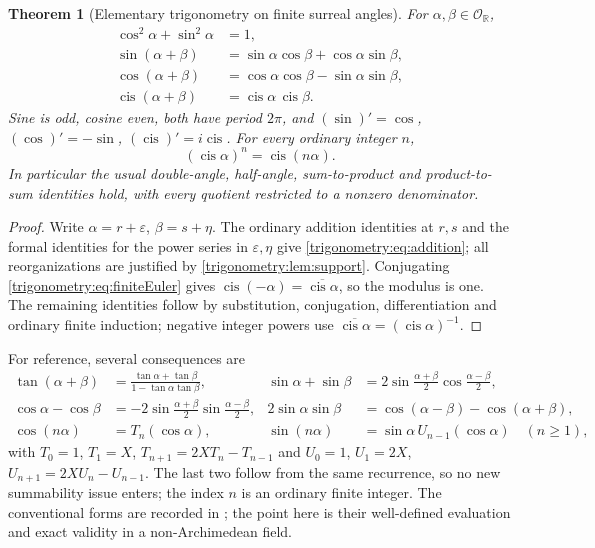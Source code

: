 \documentclass[11pt,letterpaper]{article}
\numberwithin{equation}{section}
\newtheorem{theorem}{Theorem}[section]
\theoremstyle{definition}
\theoremstyle{remark}
\newcommand{\R}{\mathbb R}
\newcommand{\OO}{\mathcal O}
\newcommand{\eps}{\varepsilon}
\newcommand{\cis}{\operatorname{cis}}
\begin{document}
\begin{theorem}[Elementary trigonometry on finite surreal angles]\label{trigonometry:thm:identities}
For $\alpha,\beta\in\OO_{\R}$,
\begin{align}
 \cos^2\alpha+\sin^2\alpha&=1,\\
 \sin(\alpha+\beta)&=\sin\alpha\cos\beta+\cos\alpha\sin\beta,\\
 \cos(\alpha+\beta)&=\cos\alpha\cos\beta-\sin\alpha\sin\beta,\\
 \cis(\alpha+\beta)&=\cis\alpha\,\cis\beta.\label{trigonometry:eq:addition}
\end{align}
Sine is odd, cosine even, both have period $2\pi$, and $(\sin)'=\cos$, $(\cos)'=-\sin$,
$(\cis)'=i\cis$. For every ordinary integer $n$,
\begin{equation}\label{trigonometry:eq:demoivre}
 (\cis\alpha)^n=\cis(n\alpha).
\end{equation}
In particular the usual double-angle, half-angle, sum-to-product and product-to-sum identities
hold, with every quotient restricted to a nonzero denominator.
\end{theorem}
\begin{proof}
Write $\alpha=r+\eps$, $\beta=s+\eta$. The ordinary addition identities at $r,s$ and the formal
identities for the power series in $\eps,\eta$ give \cref{trigonometry:eq:addition}; all
reorganizations are justified by \cref{trigonometry:lem:support}. Conjugating
\cref{trigonometry:eq:finiteEuler} gives $\cis(-\alpha)=\overline{\cis\alpha}$, so the modulus is
one. The remaining identities follow by substitution, conjugation, differentiation and ordinary
finite induction; negative integer powers use $\overline{\cis\alpha}=(\cis\alpha)^{-1}$.
\end{proof}

For reference, several consequences are
\begin{align}
 \tan(\alpha+\beta)&=\frac{\tan\alpha+\tan\beta}{1-\tan\alpha\tan\beta},&
 \sin\alpha+\sin\beta&=2\sin\tfrac{\alpha+\beta}2\cos\tfrac{\alpha-\beta}2,\\
 \cos\alpha-\cos\beta&=-2\sin\tfrac{\alpha+\beta}2\sin\tfrac{\alpha-\beta}2,&
 2\sin\alpha\sin\beta&=\cos(\alpha-\beta)-\cos(\alpha+\beta),\\
 \cos(n\alpha)&=T_n(\cos\alpha),&
 \sin(n\alpha)&=\sin\alpha\,U_{n-1}(\cos\alpha)\quad(n\ge1),\label{trigonometry:eq:chebyshev}
\end{align}
with $T_0=1$, $T_1=X$, $T_{n+1}=2XT_n-T_{n-1}$ and $U_0=1$, $U_1=2X$, $U_{n+1}=2XU_n-U_{n-1}$.
The last two follow from the same recurrence, so no new summability issue enters; the index $n$ is
an ordinary finite integer. The conventional forms are recorded in \cite[\S4.21]{DLMF}; the point
here is their well-defined evaluation and exact validity in a non-Archimedean field.
\end{document}
